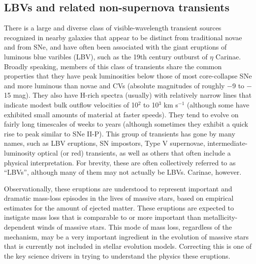 %
%

\subsection{LBVs and related non-supernova transients}
\def\secname{\chpname:LBVs}\label{sec:\secname}


There is a large and diverse class of visible-wavelength transient
sources recognized in nearby galaxies that appear to be distinct from
traditional novae and from SNe, and have often been associated with
the giant eruptions of luminous blue varibles (LBV), such as the 19th
century outburst of $\eta$ Carinae.  Broadly speaking, members of this
class of transients share the common properties that they have peak
luminosities below those of most core-collapse SNe and more luminous
than novae and CVs (absolute magnitudes of roughly $-$9 to $-$15 mag).
They also have H-rich spectra (usually) with relatively narrow lines
that indicate modest bulk outflow velocities of 10$^2$ to 10$^3$ km
s$^{-1}$ (although some have exhibited small amounts of material at
faster speeds).  They tend to evolve on fairly long timescales of
weeks to years (although sometimes they exhibit a quick rise to peak
similar to SNe II-P). This group of transients has gone by many names,
such as LBV eruptions, SN impostors, Type V supernovae,
intermediate-luminosity optical (or red) transients, as well as others
that often include a physical interpretation.  For brevity, these are
often collectively referred to as ``LBVs'', although many of them may
not actually be LBVs.
Carinae, however.

Observationally, these eruptions are understood to represent important
and dramatic mass-loss episodes in the lives of massive stars, based
on empirical estimates for the amount of ejected matter.
These eruptions are
expected to instigate mass loss that is comparable to or more
important than metallicity-dependent winds of massive stars.  This
mode of mass loss, regardless of the mechanism, may be a very
important ingredient in the evolution of massive stars that is
currently not included in stellar evolution models.  Correcting this
is one of the key science drivers in trying to understand the physics
these eruptions.

